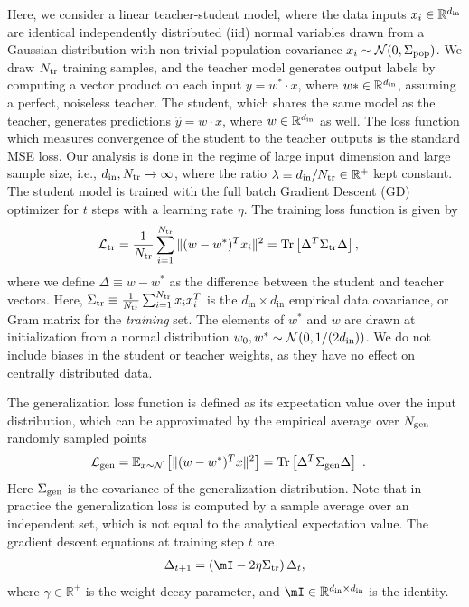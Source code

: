 \documentclass{article}
\DeclareMathOperator{\tr}{tr}
\newcommand{\norm}[1]{\| #1 \|}
\def\tr{\textrm{Tr}}
\begin{document}
Here, we consider a linear teacher-student model, where the data inputs $x_i\in\mathbb{R}^{d_\mathrm{in}}$ are identical independently distributed (iid) normal variables drawn from a Gaussian distribution with non-trivial population covariance $x_i \sim \mathcal{N}(0, \Sigma_{\mathrm{pop}})$. We draw $N_{\mathrm{tr}}$ training samples, and the teacher model generates output labels by computing a vector product on each input $y=w^*\cdot x$, where $w*\in \mathbb{R}^{d_\mathrm{in}}$,
assuming a perfect, noiseless teacher. 
The student, which shares the same model as the teacher, generates predictions $\hat{y}=w\cdot x$, where $w\in \mathbb{R}^{d_\mathrm{in}}$ as well.
The loss function which measures convergence of the student to the teacher outputs is the standard MSE loss. 
%
Our analysis is done in the regime of large input dimension and large sample size, i.e., $d_\mathrm{in},N_{\mathrm{tr}}\to \infty$, where the ratio $\lambda\equiv d_\mathrm{in}/N_{\mathrm{tr}} \in \mathbb{R}^+$ kept constant.
%
The student model is trained with the full batch Gradient Descent (GD) optimizer for $t$ steps with a learning rate $\eta$.
%
The training loss function is given by
\begin{align}
\label{eq:linear_loss}
    \mathcal{L}_\training 
    &= 
    \frac{1}{N_\training }
    \sum_{i=1}^{N_\training }
    \norm{ 
    (w  - w^*)^T x_i
    }^2 
    =
    \tr
    \left[
    \Delta ^T \Sigma_\training \Delta 
    \right],
\end{align}
where we define $\Delta \equiv w-w^*$ as the difference between the student and teacher vectors. Here, $\Sigma_{\mathrm{tr}} \equiv \frac{1}{N_{\mathrm{tr}}}  \sum_{i=1}^{N_{\mathrm{tr}}} x_ix^T_i$ is the $d_{\mathrm{in}} \times d_{\mathrm{in}}$ empirical data covariance, or Gram matrix for the {\it training} set.  The elements of $w^*$ and $w$ are drawn at initialization from a normal distribution $w_0, w^* \sim \mathcal{N}(0,1/({2 d_\mathrm{in} }))$. We do not include biases in the student or teacher weights, as they have no effect on centrally distributed data.


The generalization loss function is defined as its expectation value over the input distribution, which can be approximated by the empirical average over $N_{\mathrm{gen}}$ randomly sampled points
\begin{align}
    \mathcal{L}_\gen 
    &= \mathbb{E}_{x\sim\mathcal{N}}\left[
    \norm{ 
    (w  - w^*)^T x
    }^2\right]
    =
    \tr\left[ 
    \Delta^T \Sigma_\gen \Delta 
    \right]
    \ .
    \label{eq:generalization_linear_loss}
\end{align}
Here $\Sigma_{\mathrm{gen}}$ is the covariance of the generalization distribution. Note that in practice the generalization loss is computed by a sample average over an independent set, which is not equal to the analytical expectation value. 
%
The gradient descent equations at training step $t$ are
\begin{align}
\label{eq:GD}
    {\Delta}_{t+1}
    =
     \left( \mI  -2\eta \Sigma_\training  \right) \Delta_t,     
\end{align}
where $\gamma \in \mathbb{R}^+$ is the weight decay parameter, and $\mI \in \mathbb{R}^{\din \times \din}$ is the identity.
\end{document}
